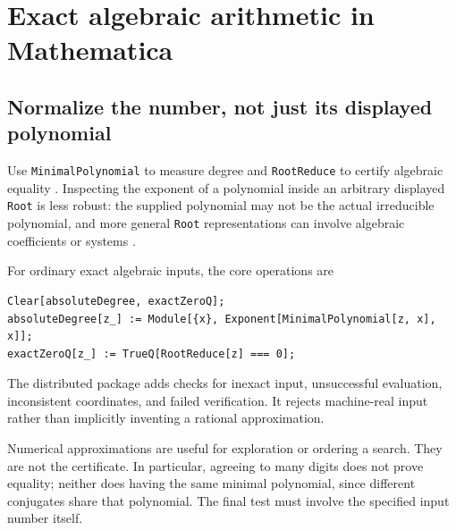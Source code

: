 \documentclass[11pt,letterpaper]{article}
\theoremstyle{definition}
\newcommand{\code}[1]{\texttt{#1}}
\begin{document}
\section{Exact algebraic arithmetic in Mathematica}
\subsection{Normalize the number, not just its displayed polynomial}
Use \code{MinimalPolynomial} to measure degree and \code{RootReduce} to certify algebraic equality \cite{minimalpoly,rootreduce}. Inspecting the exponent of a polynomial inside an arbitrary displayed \code{Root} is less robust: the supplied polynomial may not be the actual irreducible polynomial, and more general \code{Root} representations can involve algebraic coefficients or systems \cite{rootdoc}.

For ordinary exact algebraic inputs, the core operations are
\begin{samepage}
\begin{lstlisting}
Clear[absoluteDegree, exactZeroQ];
absoluteDegree[z_] := Module[{x}, Exponent[MinimalPolynomial[z, x], x]];
exactZeroQ[z_] := TrueQ[RootReduce[z] === 0];
\end{lstlisting}
\end{samepage}
The distributed package adds checks for inexact input, unsuccessful evaluation, inconsistent coordinates, and failed verification. It rejects machine-real input rather than implicitly inventing a rational approximation.

Numerical approximations are useful for exploration or ordering a search. They are not the certificate. In particular, agreeing to many digits does not prove equality; neither does having the same minimal polynomial, since different conjugates share that polynomial. The final test must involve the specified input number itself.
\end{document}
